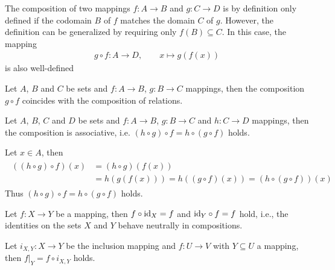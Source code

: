 \begin{remarks}
    \begin{remarkenumerate}
        \item The composition of two mappings $f\colon A\rightarrow B$ and $g\colon C\rightarrow D$ is by definition only defined if the codomain $B$ of $f$ matches the domain $C$ of $g$. However, the definition can be generalized by requiring only $f(B)\subseteq C$. In this case, the mapping
        \begin{align}g\circ f\colon A\rightarrow D,\qquad x\mapsto g(f(x))\end{align}
        is also well-defined
        \item Let $A$, $B$ and $C$ be sets and $f\colon A\rightarrow B$, $g\colon B\rightarrow C$ mappings, then the composition $g\circ f$ coincides with the composition of relations.
        \item\label{remark:mappings:composition_associative} Let $A$, $B$, $C$ and $D$ be sets and $f\colon A\rightarrow B$, $g\colon B\rightarrow C$ and $h\colon C\rightarrow D$ mappings, then the composition is associative, i.e. $(h\circ g)\circ f=h\circ (g\circ f)$ holds.
        \begin{miniproof}
            Let $x\in A$, then
            \begin{align}\begin{split}((h\circ g)\circ f)(x)&=(h\circ g)(f(x))\\&=h(g(f(x)))=h((g\circ f)(x))=(h\circ (g\circ f))(x)\end{split}\end{align}
            Thus $(h\circ g)\circ f=h\circ (g\circ f)$ holds.
        \end{miniproof}
    \end{remarkenumerate}
\end{remarks}

\begin{examples}
    \begin{exampleenumerate}
        \item\label{example:mappings:identity_compositions} Let $f\colon X\rightarrow Y$ be a mapping, then $f\circ\text{id}_X=f$ and $\text{id}_Y\circ f=f$ hold, i.e., the identities on the sets $X$ and $Y$ behave neutrally in compositions.
        \item Let $i_{X,Y}\colon X\rightarrow Y$ be the inclusion mapping and $f\colon U\rightarrow V$ with $Y\subseteq U$ a mapping, then $f\vert_Y=f\circ i_{X,Y}$ holds.
    \end{exampleenumerate}
\end{examples}


